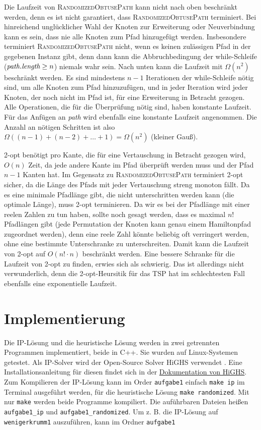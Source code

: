 \documentclass[a4paper, 10pt, ngerman]{article}
\begin{document}
Die Laufzeit von \textsc{RandomizedObtusePath} kann nicht nach oben beschränkt werden, denn es ist nicht garantiert, dass \textsc{RandomizedObtusePath} terminiert. Bei hinreichend unglücklicher Wahl der Knoten zur Erweiterung oder Neuverbindung kann es sein, dass nie alle Knoten zum Pfad hinzugefügt werden. Insbesondere terminiert \textsc{RandomizedObtusePath} nicht, wenn es keinen zulässigen Pfad in der gegebenen Instanz gibt, denn dann kann die Abbruchbedingung der while-Schleife ($\emph{path.length} \ge n$) niemals wahr sein. Nach unten kann die Laufzeit mit $\Omega(n^2)$ beschränkt werden. Es sind mindestens $n - 1$ Iterationen der while-Schleife nötig sind, um alle Knoten zum Pfad hinzuzufügen, und in jeder Iteration wird jeder Knoten, der noch nicht im Pfad ist, für eine Erweiterung in Betracht gezogen. Alle Operationen, die für die Überprüfung nötig sind, haben konstante Laufzeit. Für das Anfügen an \emph{path} wird ebenfalls eine konstante Laufzeit angenommen. Die Anzahl an nötigen Schritten ist also $\Omega((n - 1) + (n - 2) + \dots + 1) = \Omega(n^2)$ (kleiner Gauß).

2-opt benötigt pro Kante, die für eine Vertauschung in Betracht gezogen wird, $O(n)$ Zeit, da jede andere Kante im Pfad überprüft werden muss und der Pfad $n - 1$ Kanten hat. Im Gegensatz zu \textsc{RandomizedObtusePath} terminiert 2-opt sicher, da die Länge des Pfads mit jeder Vertauschung streng monoton fällt. Da es eine minimale Pfadlänge gibt, die nicht unterschritten werden kann (die optimale Länge), muss 2-opt terminieren. Da wir es bei der Pfadlänge mit einer reelen Zahlen zu tun haben, sollte noch gesagt werden, dass es maximal $n!$ Pfadlängen gibt (jede Permutation der Knoten kann genau einem Hamiltonpfad zugeordnet werden), denn eine reele Zahl könnte beliebig oft verringert werden, ohne eine bestimmte Unterschranke zu unterschreiten. Damit kann die Laufzeit von 2-opt auf $O(n! \cdot n)$ beschränkt werden. Eine bessere Schranke für die Laufzeit von 2-opt zu finden, erwies sich als schwierig. Das ist allerdings nicht verwunderlich, denn die 2-opt-Heursitik für das TSP hat im schlechtesten Fall ebenfalls eine exponentielle Laufzeit.

\section{Implementierung}

Die IP-Lösung und die heuristische Lösung werden in zwei getrennten Programmen implementiert, beide in C++. Sie wurden auf Linux-Systemen getestet. Als IP-Solver wird der Open-Source Solver HiGHS verwendet \cite{highs}. Eine Installationsanleitung für diesen findet sich in der \href{https://ergo-code.github.io/HiGHS/dev/cpp/get-started/}{Dokumentation von HiGHS}. Zum Kompilieren der IP-Lösung kann im Order \verb|aufgabe1| einfach \verb|make ip| im Terminal ausgeführt werden, für die heuristische Lösung \verb|make randomized|. Mit nur \verb|make| werden beide Programme kompiliert. Die auführbaren Dateien heißen \verb|aufgabe1_ip| und \verb|aufgabe1_randomized|. Um z. B. die IP-Lösung auf \verb|wenigerkrumm1| auszuführen, kann im Ordner \verb|aufgabe1|
\end{document}
